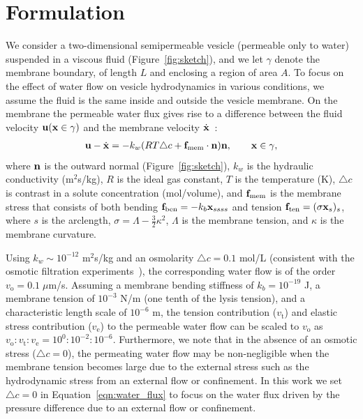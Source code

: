 \documentclass[prb,preprint,showpacs,preprintnumbers,amsmath,amssymb,longbibliography]{revtex4-1}
\begin{document}
\section{Formulation\label{sec:formulation}}
We consider a two-dimensional semipermeable vesicle (permeable only to
water) suspended in a viscous fluid (Figure~\ref{fig:sketch}), and we
let $\gamma$ denote the membrane boundary, of length $L$ and enclosing a
region of area $A$.
%
%
To focus on the effect of water flow on vesicle
hydrodynamics in various conditions, we assume the fluid is the same
inside and outside the vesicle membrane. On the membrane the permeable
water flux gives rise to a difference between the fluid velocity
${\mathbf{u}}({\mathbf{x}}\in \gamma)$ and the membrane velocity
$\dot{\mathbf{x}}$~\cite{yao-mor2017}:
\begin{align}
\label{eqn:water_flux}
  \mathbf{u} - \dot{\mathbf{x}} = - k_w (R T \triangle c + \mathbf{f}_\mathrm{mem} \cdot \mathbf{n}) \mathbf{n}, \qquad
  \mathbf{x} \in \gamma,
\end{align}
where $\mathbf{n}$ is the outward normal (Figure~\ref{fig:sketch}), $k_w$ is
the hydraulic conductivity (m$^2$s/kg), $R$ is the ideal gas constant,
$T$ is the temperature (K), $\triangle c$ is contrast in a solute
concentration (mol/volume), and $\mathbf{f}_\mathrm{mem}$ is the membrane
stress that consists of both bending $ \mathbf{f}_\mathrm{ben}= -k_b
\mathbf{x}_{ssss}$ and tension $\mathbf{f}_\mathrm{ten}=(\sigma \mathbf{x}_s)_s$, where $s$
is the arclength, $\sigma = \Lambda - \frac{3}{2}\kappa^2$, $\Lambda$ is the
membrane tension, and $\kappa$ is the membrane curvature. 

Using $k_w\sim 10^{-12}$ m$^2$s/kg 
and an osmolarity $\triangle c = 0.1$ mol/L (consistent with the osmotic
filtration experiments~\cite{OlbrichRawiczNeedhamEtAl2000_BJ}), the
corresponding water flow is of the order $v_\mathrm{o}=0.1 \; \mu$m/s.
Assuming a membrane bending stiffness of $k_b = 10^{-19}$ J, a membrane
tension of $10^{-3}$ N/m (one tenth of the lysis tension), and a
characteristic length scale of $10^{-6}$ m, the tension contribution
($v_\mathrm{t}$) and elastic stress contribution ($v_\mathrm{e}$) to the
permeable water flow can be scaled to $v_\mathrm{o}$ as
$v_\mathrm{o}:v_\mathrm{t}:v_\mathrm{e}=10^{0}:10^{-2}:10^{-6}$.
Furthermore, we note that in the absence of an osmotic stress
($\triangle c = 0$), the permeating water flow may be non-negligible
when the membrane tension becomes large due to the external stress such
as the hydrodynamic stress from an external flow or confinement. In this
work we set $\triangle c = 0$ in Equation~\eqref{eqn:water_flux} to
focus on the water flux driven by the pressure difference due to an
external flow or confinement.
\end{document}
